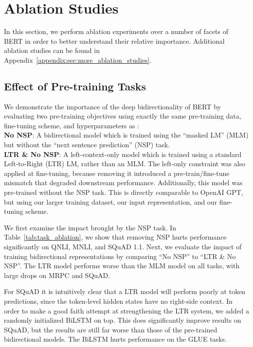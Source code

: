\section{Ablation Studies}
\label{sec:ablation}
In this section, we perform ablation experiments over a number of facets of BERT in order to better understand their relative importance. Additional ablation studies can be found in Appendix~\ref{appendix:sec:more_ablation_studies}.

\subsection{Effect of Pre-training Tasks}

\label{sec:task_ablation}
We demonstrate the importance of the deep bidirectionality of BERT by evaluating two pre-training objectives using exactly the same pre-training data, fine-tuning scheme, and hyperparameters as \bertbase:
\vspace{0.3cm}
\\
\noindent\textbf{No NSP}: A bidirectional model which is trained using the ``masked LM'' (MLM) but without the ``next sentence prediction'' (NSP) task.\\
\noindent\textbf{LTR \& No NSP}: A left-context-only model which is trained using a standard Left-to-Right (LTR) LM, rather than an MLM. The left-only constraint was also applied at fine-tuning, because  removing it introduced a pre-train/fine-tune mismatch that degraded downstream performance. Additionally, this model was pre-trained without the NSP task. This is directly comparable to OpenAI GPT, but using our larger training dataset, our input representation, and our fine-tuning scheme.


We first examine the impact brought by the NSP task. In Table~\ref{tab:task_ablation}, we show that removing NSP hurts performance significantly on QNLI, MNLI, and SQuAD 1.1. Next, we evaluate the impact of training bidirectional representations by comparing ``No NSP'' to ``LTR \& No NSP''. The LTR model performs worse than the MLM model on all tasks, with large drops on MRPC and SQuAD.

For SQuAD it is intuitively clear that a LTR model will perform poorly at token predictions, since the token-level hidden states have no right-side context.
In order to make a good faith attempt at strengthening the LTR system, we added a randomly initialized BiLSTM on top. This does significantly improve results on SQuAD, but the results are still far worse than those of the pre-trained bidirectional models. The BiLSTM hurts performance on the GLUE tasks. 

